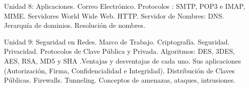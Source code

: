 \documentclass[10pt,a4paper]{article}
\begin{document}
{Unidad 8:
Aplicaciones. Correo Electrónico. Protocolos : SMTP, POP3 e IMAP, MIME. Servidores World Wide Web. HTTP. Servidor de Nombres: DNS. Jerarquía de dominios. Resolución de nombres.

Unidad 9:
Seguridad en Redes. Marco de Trabajo. Criptografía. Seguridad. Privacidad. Protocolos de Clave Pública y Privada. Algoritmos: DES, 3DES, AES, RSA, MD5 y SHA .Ventajas y desventajas de cada uno. Sus aplicaciones (Autorización, Firma, Confidencialidad e Integridad). Distribución de Claves Públicas. Firewalls. Tunneling. Conceptos de amenazas, ataques, intrusiones.
}
\end{document}
